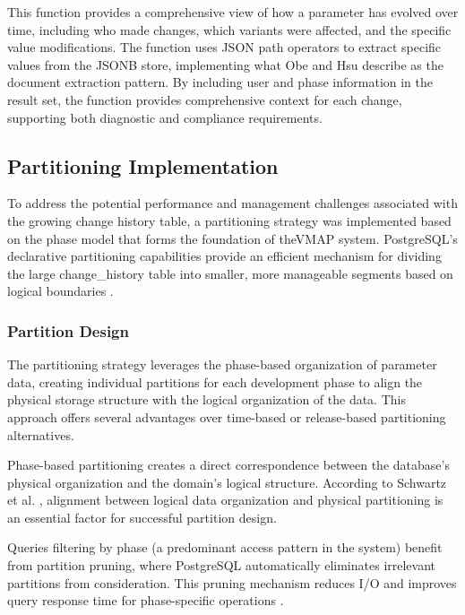 This function provides a comprehensive view of how a parameter has evolved over time, including who made changes, which variants were affected, and the specific value modifications. The function uses JSON path operators to extract specific values from the JSONB store, implementing what Obe and Hsu \cite{obe2017postgresql} describe as the document extraction pattern. By including user and phase information in the result set, the function provides comprehensive context for each change, supporting both diagnostic and compliance requirements.

\subsection{Partitioning Implementation}
\label{subsec:partitioning-implementation}

To address the potential performance and management challenges associated with the growing change history table, a partitioning strategy was implemented based on the phase model that forms the foundation of the\ac{VMAP} system. PostgreSQL's declarative partitioning capabilities provide an efficient mechanism for dividing the large change\_history table into smaller, more manageable segments based on logical boundaries \cite{obe2017postgresql}.

\subsubsection{Partition Design}
\label{subsubsec:partition-design}

The partitioning strategy leverages the phase-based organization of parameter data, creating individual partitions for each development phase to align the physical storage structure with the logical organization of the data. This approach offers several advantages over time-based or release-based partitioning alternatives.

Phase-based partitioning creates a direct correspondence between the database's physical organization and the domain's logical structure. According to Schwartz et al. \cite{schwartz2012high}, alignment between logical data organization and physical partitioning is an essential factor for successful partition design.

Queries filtering by phase (a predominant access pattern in the system) benefit from partition pruning, where PostgreSQL automatically eliminates irrelevant partitions from consideration. This pruning mechanism reduces I/O and improves query response time for phase-specific operations \cite{obe2017postgresql}.

